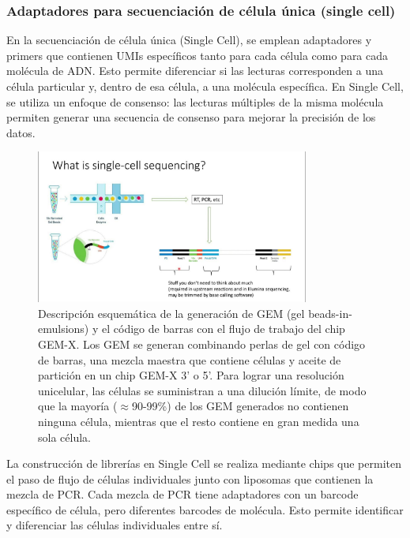 \subsubsection{Adaptadores para secuenciación de célula única (single cell)}
En la secuenciación de célula única (Single Cell), se emplean adaptadores y primers que contienen UMIs específicos tanto para cada célula como para cada molécula de ADN. Esto permite diferenciar si las lecturas corresponden a una célula particular y, dentro de esa célula, a una molécula específica. En Single Cell, se utiliza un enfoque de consenso: las lecturas múltiples de la misma molécula permiten generar una secuencia de consenso para mejorar la precisión de los datos.

\begin{figure}[htbp]
\centering
\includegraphics[width = 0.8\textwidth]{figs/single-cell-seq.jpg}
\caption{Descripción esquemática de la generación de GEM (gel beads-in-emulsions) y el código de barras con el flujo de trabajo del chip GEM-X. Los GEM se generan combinando perlas de gel con código de barras, una mezcla maestra que contiene células y aceite de partición en un chip GEM-X 3' o 5'. Para lograr una resolución unicelular, las células se suministran a una dilución límite, de modo que la mayoría ($\approx$90-99\%) de los GEM generados no contienen ninguna célula, mientras que el resto contiene en gran medida una sola célula.}
\end{figure}

La construcción de librerías en Single Cell se realiza mediante chips que permiten el paso de flujo de células individuales junto con liposomas que contienen la mezcla de PCR. Cada mezcla de PCR tiene adaptadores con un barcode específico de célula, pero diferentes barcodes de molécula. Esto permite identificar y diferenciar las células individuales entre sí.

